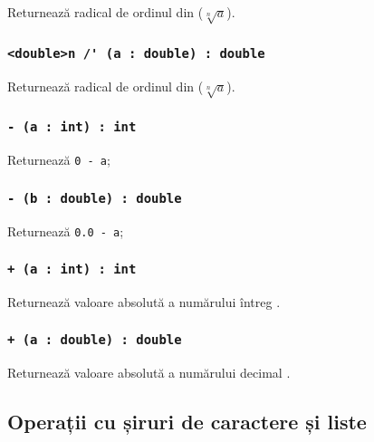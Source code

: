 Returnează radical de ordinul  din  ($\sqrt[n]{a}$).

\subsubsection{\lstinline|<double>n /' (a : double) : double|}

Returnează radical de ordinul  din  ($\sqrt[n]{a}$).


\subsubsection{\lstinline|- (a : int) : int|}

Returnează \lstinline|0 - a|;

\subsubsection{\lstinline|- (b : double) : double|}

Returnează \lstinline|0.0 - a|;

\subsubsection{\lstinline|+ (a : int) : int|}

Returnează valoare absolută a numărului întreg .

\subsubsection{\lstinline|+ (a : double) : double|}

Returnează valoare absolută a numărului decimal .

\subsection{Operații cu șiruri de caractere și liste}

